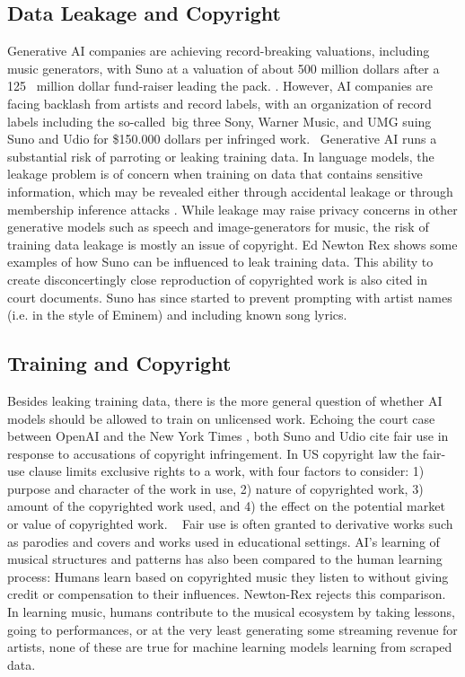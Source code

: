 \subsection{Data Leakage and Copyright}
Generative AI companies are achieving record-breaking valuations, including music generators, with Suno at a valuation of about 500 million dollars after a 125  million dollar fund-raiser leading the pack. \cite{Stassen_2024} \cite{Tencer_2024}. However, AI companies are facing backlash from artists and record labels, with an organization of record labels including the so-called big three Sony, Warner Music, and UMG suing Suno and Udio for \$150.000 dollars per infringed work\cite{Kaba_River_Perry_2024}.  Generative AI runs a substantial risk of parroting or leaking training data. In language models, the leakage problem is of concern when training on data that contains sensitive information, which may be revealed either through accidental leakage or through membership inference attacks \cite{Duan_Suri_Mireshghallah_Min_Shi_Zettlemoyer_Tsvetkov_Choi_Evans_Hajishirzi_2024}. While leakage may raise privacy concerns in other generative models such as speech and image-generators \cite{Carlini_Hayes_Nasr_Jagielski_Sehwag_Tramèr_Balle_Ippolito_Wallace_2023} for music, the risk of training data leakage is mostly an issue of copyright. Ed Newton Rex shows some examples of how Suno can be influenced \cite{Newton-Rex_2024} to leak training data. This ability to create disconcertingly close reproduction of copyrighted work is also cited in court documents. Suno has since started to prevent prompting with artist names (i.e. in the style of Eminem) and including known song lyrics. 

\subsection{Training and Copyright}
Besides leaking training data, there is the more general question of whether AI models should be allowed to train on unlicensed work. Echoing the court case between OpenAI and the New York Times \cite{Reed_2024}, both Suno and Udio cite fair use in response to accusations of copyright infringement. In US copyright law the fair-use clause limits exclusive rights to a work, with four factors to consider: 1) purpose and character of the work in use, 2) nature of copyrighted work, 3) amount of the copyrighted work used, and 4) the effect on the potential market or value of copyrighted work.\cite{copyrightlaw}   Fair use is often granted to derivative works such as parodies and covers and works used in educational settings. AI’s learning of musical structures and patterns has also been compared to the human learning process: Humans learn based on copyrighted music they listen to without giving credit or compensation to their influences. Newton-Rex \cite{Newton-Rex_2024} rejects this comparison. In learning music, humans contribute to the musical ecosystem by taking lessons, going to performances, or at the very least generating some streaming revenue for artists, none of these are true for machine learning models learning from scraped data. 

